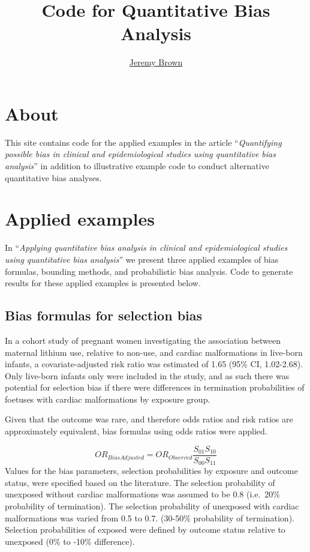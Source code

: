 \documentclass[
]{book}
\title{Code for Quantitative Bias Analysis}
\author{\href{https://twitter.com/jeremy_pbrown}{Jeremy Brown}}
\date{}
\begin{document}
\maketitle

{
\setcounter{tocdepth}{1}
\tableofcontents
}
\hypertarget{about}{%
\chapter{About}\label{about}}

This site contains code for the applied examples in the article ``\emph{Quantifying possible bias in clinical and epidemiological studies using quantitative bias analysis}'' in addition to illustrative example code to conduct alternative quantitative bias analyses.

\hypertarget{applied-examples}{%
\chapter{Applied examples}\label{applied-examples}}

In ``\emph{Applying quantitative bias analysis in clinical and epidemiological studies using quantitative bias analysis}'' we present three applied examples of bias formulas, bounding methods, and probabilistic bias analysis. Code to generate results for these applied examples is presented below.

\hypertarget{bias-formulas-for-selection-bias}{%
\section{Bias formulas for selection bias}\label{bias-formulas-for-selection-bias}}

In a cohort study of pregnant women investigating the association between maternal lithium use, relative to non-use, and cardiac malformations in live-born infants, a covariate-adjusted risk ratio was estimated of 1.65 (95\% CI, 1.02-2.68).\citep{patorno2017lithium} Only live-born infants only were included in the study, and as such there was potential for selection bias if there were differences in termination probabilities of foetuses with cardiac malformations by exposure group.

Given that the outcome was rare, and therefore odds ratios and risk ratios are approximately equivalent, bias formulas using odds ratios were applied.\citep{greenland1996basic}

\[
OR_{BiasAdjusted} = OR_{Observed}\frac{S_{01}S_{10}}{S_{00}S_{11}}
\]
Values for the bias parameters, selection probabilities by exposure and outcome status, were specified based on the literature. The selection probability of unexposed without cardiac malformations was assumed to be 0.8 (i.e.~20\% probability of termination). The selection probability of unexposed with cardiac malformations was varied from 0.5 to 0.7. (30-50\% probability of termination). Selection probabilities of exposed were defined by outcome status relative to unexposed (0\% to -10\% difference).
\end{document}
